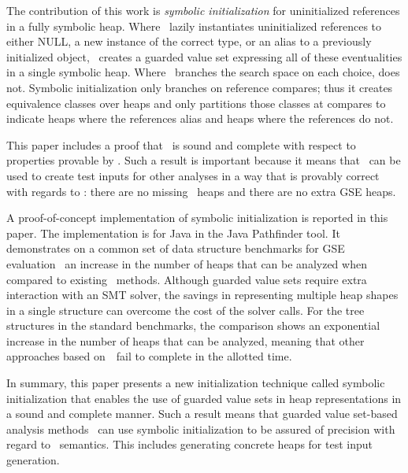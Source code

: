 The contribution of this work is \emph{symbolic initialization} for 
uninitialized references in a fully symbolic heap. Where \gsetxt\ lazily
instantiates uninitialized references to either NULL, a new instance
of the correct type, or an alias to a previously initialized object, \symtxt\ creates a guarded value set
expressing all of these eventualities in a single symbolic heap. Where
\gsetxt\ branches the search space on each choice, \symtxt{} does not. Symbolic initialization only branches on reference compares; thus it creates equivalence classes over heaps and only partitions those classes at compares to indicate heaps where the references
alias and heaps where the references do not.

This paper includes a proof that \symtxt\ is sound and
complete with respect to properties provable by \gsetxt. Such a result is
important because it means that \symtxt\ can be used to
create test inputs for other analyses in a way that is provably
correct with regards to \gsetxt: there are no missing \gsetxt\ heaps and there are
no extra GSE heaps.

A proof-of-concept implementation of symbolic initialization is
reported in this paper. The implementation is for Java in the Java
Pathfinder tool. It demonstrates on a common set of data structure benchmarks for GSE evaluation~\cite{Deng:2006,Deng:2007,boyapati2002korat,Ferrara:2014,Rosner:2015} an increase in the number of heaps that can be analyzed when compared to existing~\gsetxt{} methods. Although guarded value
sets require extra interaction with an SMT solver, the
savings in representing multiple heap shapes in a single
structure can overcome the cost of the solver calls. For the tree structures in the standard benchmarks, the
comparison shows an exponential increase in the number of heaps that
can be analyzed, meaning that other
approaches based on~\gsetxt\ fail to complete in the allotted time.

In summary, this paper presents a new initialization technique called symbolic initialization that
enables the use of guarded value sets in heap representations in a
sound and complete manner. Such a result means that guarded 
value set-based analysis methods~\cite{Ferrara:2014,Torlak:2014,Sen:2014,Xie:2005,Dillig:2011,Yorsh:2008} can use symbolic initialization to be assured of precision with regard
to~\gsetxt{} semantics. This includes generating concrete heaps for test input generation.
